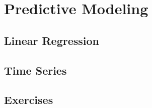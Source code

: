 \chapter{Predictive Modeling}

\section{Linear Regression}

\section{Time Series}

\section{Exercises}

